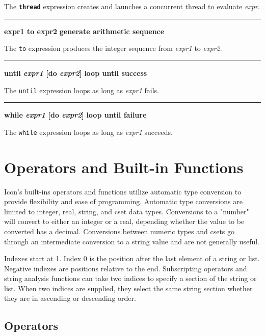\noindent
{}The \texttt{\bf thread} expression creates and launches
a concurrent thread to evaluate \textit{expr}.

\bigskip\hrule\vspace{0.1cm}
\noindent
{\bf expr1 to expr2 } \hfill {\bf generate arithmetic sequence}

\noindent
{}The \texttt{to} expression produces the integer
sequence from \textit{expr1} to \textit{expr2}.

\bigskip\hrule\vspace{0.1cm}
\noindent
{\bf \textbf{until} \textit{expr1} [do \textit{expr2}] } \hfill {\bf loop until success}

\noindent
{}The \texttt{until} expression loops as long
as \textit{expr1} fails.

\bigskip\hrule\vspace{0.1cm}
\noindent
{\bf \textbf{while} \textit{expr1} [do \textit{expr2}] } \hfill {\bf loop until failure}

\noindent
{}The \texttt{while} expression loops as long as
\textit{expr1} succeeds.

\section{Operators and Built-in Functions}

Icon's built-ins operators and functions utilize
automatic type conversion to provide flexibility and ease of
programming. Automatic type
conversions are limited to
integer, real, string, and cset data types. Conversions to a "number" will
convert to either an integer or a real, depending whether the value to
be converted has a decimal. Conversions between numeric types and csets
go through an intermediate conversion to a string value and are not
generally useful.

Indexes start at 1. Index 0 is the position after the last element of a
string or list. Negative indexes are positions
relative to the end. Subscripting operators and string analysis
functions can take two indices to specify a section of the string or
list. When two indices are supplied, they select the same string
section whether they are in ascending or descending order.

\subsection*{Operators}

